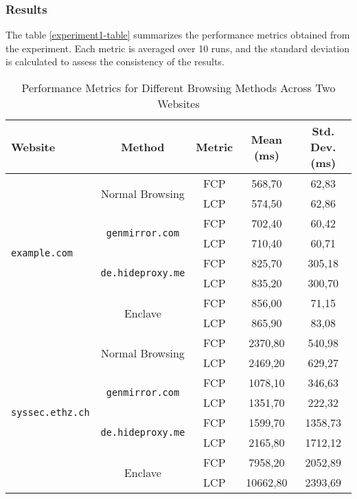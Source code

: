 \subsubsection{Results}
The table \ref{experiment1-table} summarizes the performance metrics obtained from the experiment. Each metric is averaged over 10 runs, and the standard deviation is calculated to assess the consistency of the results.

\begin{table}[h!] \label{experiment1-table}
\begin{center}
    \centering
    \caption{Performance Metrics for Different Browsing Methods Across Two Websites}
    \label{tab:performance_metrics}
    \begin{tabular}{lcccc}
        \toprule
        \textbf{Website} & \textbf{Method} & \textbf{Metric} & \textbf{Mean (ms)} & \textbf{Std. Dev. (ms)} \\
        \midrule
        \multirow{8}{*}{\centering \texttt{example.com}} 
            & \multirow{2}{*}{Normal Browsing} 
            & FCP & 568,70 & 62,83 \\
            & &  LCP & 574,50 & 62,86\\
            \cmidrule{2-5}
            & \multirow{2}{*}{\texttt{genmirror.com}} 
            & FCP & 702,40 & 60,42 \\
            & &  LCP & 710,40 & 60,71\\
            \cmidrule{2-5}
            & \multirow{2}{*}{\texttt{de.hideproxy.me}} 
            & FCP & 825,70 & 305,18 \\
            & &  LCP & 835,20 & 300,70\\
            \cmidrule{2-5}
            & \multirow{2}{*}{Enclave} 
            & FCP & 856,00 & 71,15 \\
            & &  LCP & 865,90 & 83,08\\
        \midrule
        \multirow{8}{*}{\centering \texttt{syssec.ethz.ch}} 
            & \multirow{2}{*}{Normal Browsing} 
            & FCP & 2370,80 & 540,98 \\
            & &  LCP & 2469,20 & 629,27\\
            \cmidrule{2-5}
            & \multirow{2}{*}{\texttt{genmirror.com}} 
            & FCP & 1078,10 & 346,63 \\
            & &  LCP & 1351,70 & 222,32\\
            \cmidrule{2-5}
            & \multirow{2}{*}{\texttt{de.hideproxy.me}} 
            & FCP & 1599,70 & 1358,73 \\
            & &  LCP & 2165,80 & 1712,12\\
            \cmidrule{2-5}
            & \multirow{2}{*}{Enclave} 
            & FCP & 7958,20 & 2052,89 \\
            & &  LCP & 10662,80 & 2393,69\\
        \bottomrule
        
    \end{tabular}
\end{center}
\end{table}

